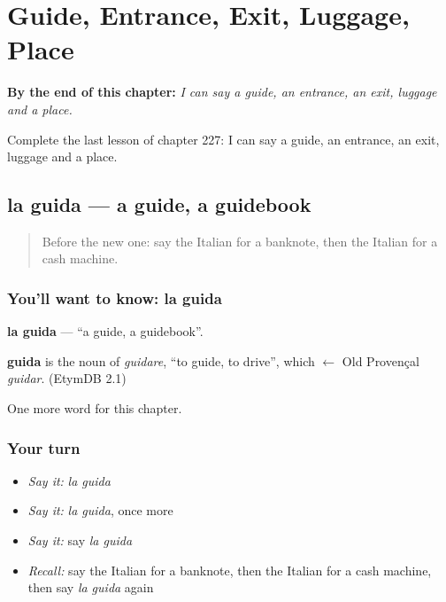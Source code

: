 
\chapter{Guide, Entrance, Exit, Luggage, Place}
\label{ch:it-guide-entrance-exit-luggage-place}

\begin{chapteropening}
\textbf{By the end of this chapter:} \emph{I can say a guide, an entrance, an exit, luggage and a place.}

Complete the last lesson of chapter 227: I can say a guide, an entrance, an exit, luggage and a place.
\end{chapteropening}

\section[la guida]{la guida — a guide, a guidebook}

\label{lesson:IT-C227-guida}



\begin{quote}
Before the new one: say the Italian for a banknote, then the Italian for a cash machine.
\end{quote}

\subsection*{You'll want to know: la guida}
\textbf{la guida} — \textquotedblleft{}a guide, a guidebook\textquotedblright{}.

\begin{cousinweb}
\textbf{guida} is the noun of \emph{guidare}, \textquotedblleft{}to guide, to drive\textquotedblright{}, which $\leftarrow$ Old Provençal \emph{guidar}. (EtymDB 2.1)
\end{cousinweb}

\begin{grammarlens}[title={What you've built}]
One more word for this chapter.
\end{grammarlens}

\subsection*{Your turn}
\begin{itemize}
\raggedright
  \item \emph{Say it:} \emph{la guida}
  \item \emph{Say it:} \emph{la guida}, once more
  \item \emph{Say it:} say \emph{la guida}
  \item \emph{Recall:} say the Italian for a banknote, then the Italian for a cash machine, then say \emph{la guida} again
\end{itemize}

